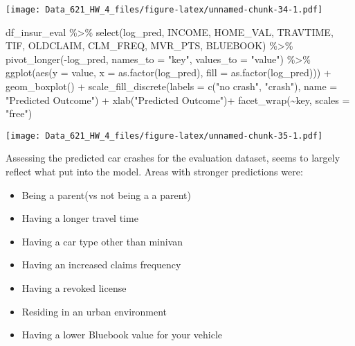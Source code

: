 \documentclass[
]{article}
\newenvironment{Shaded}{\begin{snugshade}}{\end{snugshade}}
\newcommand{\AttributeTok}[1]{\textcolor[rgb]{0.77,0.63,0.00}{#1}}
\newcommand{\FunctionTok}[1]{\textcolor[rgb]{0.00,0.00,0.00}{#1}}
\newcommand{\NormalTok}[1]{#1}
\newcommand{\SpecialCharTok}[1]{\textcolor[rgb]{0.00,0.00,0.00}{#1}}
\newcommand{\StringTok}[1]{\textcolor[rgb]{0.31,0.60,0.02}{#1}}
\providecommand{\tightlist}{%
  \setlength{\itemsep}{0pt}\setlength{\parskip}{0pt}}
\begin{document}
\texttt{[image: Data\_621\_HW\_4\_files/figure-latex/unnamed-chunk-34-1.pdf]}

\begin{Shaded}
\begin{Highlighting}[]
\NormalTok{df\_insur\_eval }\SpecialCharTok{\%\textgreater{}\%} 
  \FunctionTok{select}\NormalTok{(log\_pred, INCOME, HOME\_VAL, TRAVTIME, TIF, OLDCLAIM,}
\NormalTok{         CLM\_FREQ, MVR\_PTS, BLUEBOOK) }\SpecialCharTok{\%\textgreater{}\%} 
  \FunctionTok{pivot\_longer}\NormalTok{(}\SpecialCharTok{{-}}\NormalTok{log\_pred, }\AttributeTok{names\_to =} \StringTok{"key"}\NormalTok{, }\AttributeTok{values\_to =} \StringTok{"value"}\NormalTok{) }\SpecialCharTok{\%\textgreater{}\%}  
  \FunctionTok{ggplot}\NormalTok{(}\FunctionTok{aes}\NormalTok{(}\AttributeTok{y =}\NormalTok{ value, }\AttributeTok{x =} \FunctionTok{as.factor}\NormalTok{(log\_pred), }\AttributeTok{fill =} \FunctionTok{as.factor}\NormalTok{(log\_pred))) }\SpecialCharTok{+} 
  \FunctionTok{geom\_boxplot}\NormalTok{() }\SpecialCharTok{+} 
  \FunctionTok{scale\_fill\_discrete}\NormalTok{(}\AttributeTok{labels =} \FunctionTok{c}\NormalTok{(}\StringTok{"no crash"}\NormalTok{, }\StringTok{"crash"}\NormalTok{),}
                      \AttributeTok{name =} \StringTok{"Predicted Outcome"}\NormalTok{) }\SpecialCharTok{+}
  \FunctionTok{xlab}\NormalTok{(}\StringTok{"Predicted Outcome"}\NormalTok{)}\SpecialCharTok{+}
  \FunctionTok{facet\_wrap}\NormalTok{(}\SpecialCharTok{\textasciitilde{}}\NormalTok{key, }\AttributeTok{scales =} \StringTok{"free"}\NormalTok{)}
\end{Highlighting}
\end{Shaded}

\texttt{[image: Data\_621\_HW\_4\_files/figure-latex/unnamed-chunk-35-1.pdf]}

Assessing the predicted car crashes for the evaluation dataset, seems to
largely reflect what put into the model. Areas with stronger predictions
were:

\begin{itemize}
\tightlist
\item
  Being a parent(vs not being a a parent)
\item
  Having a longer travel time
\item
  Having a car type other than minivan
\item
  Having an increased claims frequency
\item
  Having a revoked license
\item
  Residing in an urban environment
\item
  Having a lower Bluebook value for your vehicle
\end{itemize}
\end{document}
